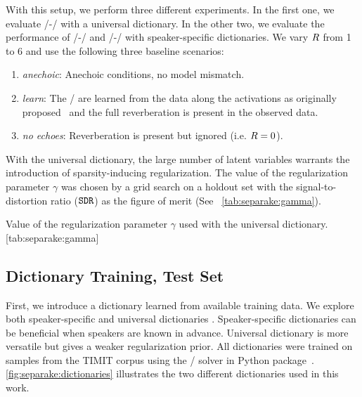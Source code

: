 \mynewline
With this setup, we perform three different experiments.
In the first one, we evaluate \MU/-\NMF/ with a universal dictionary.
In the other two, we evaluate the performance of \MU/-\NMF/ and \EM/-\NMF/ with speaker-specific dictionaries.
We vary $R$ from 1 to 6 and use the following three baseline scenarios:
\begin{enumerate}
\item \textit{anechoic}: Anechoic conditions, no model mismatch.
\item \textit{learn}: The \RTFs/ are learned from the data along the activations as originally proposed~ and the full reverberation is present in the observed data.
\item \textit{no echoes}: Reverberation is present but ignored (i.e. $R=0$).
\end{enumerate}
With the universal dictionary, the large number of latent variables warrants the introduction of sparsity-inducing regularization.
The value of the regularization parameter $\gamma$ was chosen by a grid search on a holdout set with the signal-to-distortion ratio ($\mathtt{SDR}$) as the figure of merit  (See ~\cref{tab:separake:gamma}).

\begin{table}
    \begin{sidecaption}[]{
        Value of the regularization parameter $\gamma$ used with the universal dictionary.
        }[tab:separake:gamma]
        \centering
        \small
        
    \end{sidecaption}
\end{table}


\subsection{Dictionary Training, Test Set}\label{subsec:separake:dictionary}
First, we introduce a dictionary learned from available training data.
We explore both speaker-specific and universal dictionaries .
Speaker-specific dictionaries can be beneficial when speakers are known in advance.
Universal dictionary is more versatile but gives a weaker regularization prior.
All dictionaries were trained on samples from the TIMIT corpus  using the \NMF/ solver in  Python package~.
\cref{fig:separake:dictionaries} illustrates the two different dictionaries used in this work.

